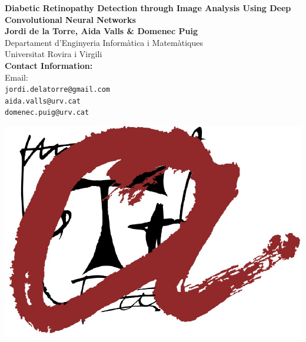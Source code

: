 \documentclass[a0,portrait]{a0poster}
\begin{document}


\begin{minipage}[b]{0.8\linewidth}
\veryHuge \color{NavyBlue} \textbf{Diabetic Retinopathy Detection through Image Analysis Using Deep Convolutional Neural Networks} \color{Black}\\ %
\huge \textbf{Jordi de la Torre, Aida Valls \& Domenec Puig}\\ %
\huge Departament d'Enginyeria Inform\`atica i Matem\`atiques\\
\huge Universitat Rovira i Virgili\\ %
%
\color{DarkSlateGray}\Large \textbf{Contact Information:}\\
Email:\\ 
\texttt{jordi.delatorre@gmail.com}\\ %
\texttt{aida.valls@urv.cat}\\
\texttt{domenec.puig@urv.cat}\\
\end{minipage}
%
\begin{minipage}[b]{0.19\linewidth}
\includegraphics[width=20cm]{logourv.eps} %
\end{minipage}
\end{document}
